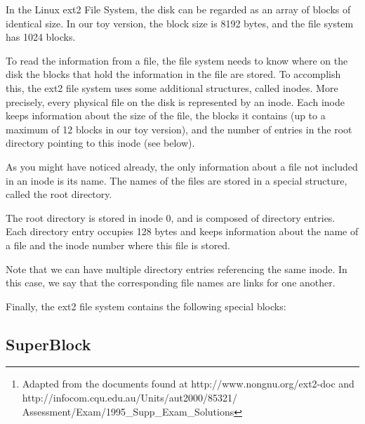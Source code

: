 \documentclass{article}
\title{}
\author{Short Description of the Linux ext2 File System \footnote{Adapted from the documents found at http://www.nongnu.org/ext2-doc and http://infocom.cqu.edu.au/Units/aut2000/85321/ Assessment/Exam/1995\_Supp\_Exam\_Solutions}}
\date{July 30, 2003}
\begin{document}
\maketitle
\begin{flushleft}

\thispagestyle{empty}

\vspace{0.5in}



In the Linux ext2 File System, the disk can be regarded as an array of blocks 
of identical size. In our toy version, the block size is 8192 bytes, 
and the file system has 1024 blocks.


\vspace{0.1in}
To read the information from a file, the file system needs to know where on 
the disk the blocks that hold the information in the file are stored.  
To accomplish this, the ext2 file system uses some additional structures, 
called inodes.  More precisely, every physical file on the disk is represented 
by an inode. Each inode keeps information about the size of the file, the 
blocks it contains (up to a maximum of 12 blocks in our toy version), and the 
number of entries in the root directory pointing to this inode (see below).

\vspace{0.1in}
As you might have noticed already, the only information about a file not 
included in an inode is its name.  The names of the files are stored in a 
special structure, called the root directory.  

\vspace{0.1in}
The root directory is stored in inode 0, and is composed of directory
entries.  Each directory entry occupies 128 bytes and keeps information about 
the name of a file and the inode number where this file is stored.  

\vspace{0.1in}
Note that  we can have multiple directory entries referencing the same inode.  
In this case, we say that the corresponding  file names are links for one 
another.

\vspace{0.1in}

Finally, the ext2 file system contains the following special blocks:

\subsection*{SuperBlock}


\end{flushleft}
\end{document}
